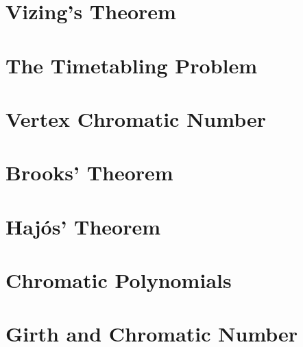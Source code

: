 		\section{Vizing's Theorem}

		\section{The Timetabling Problem}

		\section{Vertex Chromatic Number}

		\section{Brooks' Theorem}

		\section{Haj\'{o}s' Theorem}

		\section{Chromatic Polynomials}

		\section{Girth and Chromatic Number}


